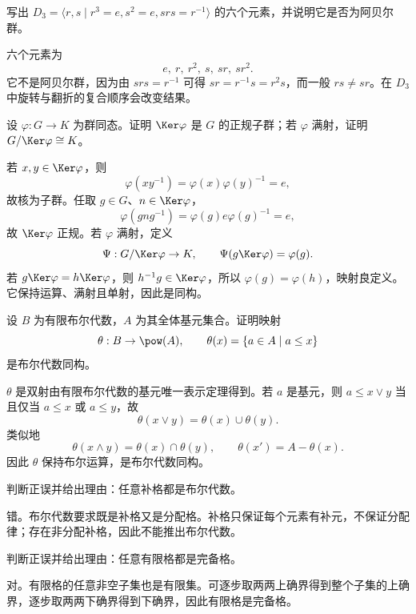 \begin{exercise}[level=advanced]
写出 $D_3=\langle r,s\mid r^3=e,s^2=e,srs=r^{-1}\rangle$ 的六个元素，并说明它是否为阿贝尔群。
\begin{solution}
六个元素为
  \[
  e,\ r,\ r^2,\ s,\ sr,\ sr^2.
  \]
  它不是阿贝尔群，因为由 $srs=r^{-1}$ 可得 $sr=r^{-1}s=r^2s$，而一般 $rs\ne sr$。在 $D_3$ 中旋转与翻折的复合顺序会改变结果。
\end{solution}
\end{exercise}

\begin{exercise}[level=advanced]
设 $\varphi:G\to K$ 为群同态。证明 $\Ker\varphi$ 是 $G$ 的正规子群；若 $\varphi$ 满射，证明 $G/\Ker\varphi\cong K$。
\begin{solution}
若 $x,y\in\Ker\varphi$，则
  \[
  \varphi(xy^{-1})=\varphi(x)\varphi(y)^{-1}=e,
  \]
  故核为子群。任取 $g\in G$、$n\in\Ker\varphi$，
  \[
  \varphi(gng^{-1})=\varphi(g)e\varphi(g)^{-1}=e,
  \]
  故 $\Ker\varphi$ 正规。若 $\varphi$ 满射，定义
  \[
  \Psi:G/\Ker\varphi\to K,\qquad \Psi(g\Ker\varphi)=\varphi(g).
  \]
  若 $g\Ker\varphi=h\Ker\varphi$，则 $h^{-1}g\in\Ker\varphi$，所以 $\varphi(g)=\varphi(h)$，映射良定义。它保持运算、满射且单射，因此是同构。
\end{solution}
\end{exercise}

\begin{exercise}[level=advanced]
设 $B$ 为有限布尔代数，$A$ 为其全体基元集合。证明映射
  \[
  \theta:B\to\pow(A),\qquad \theta(x)=\{a\in A\mid a\le x\}
  \]
  是布尔代数同构。
\begin{solution}
$\theta$ 是双射由有限布尔代数的基元唯一表示定理得到。若 $a$ 是基元，则 $a\le x\vee y$ 当且仅当 $a\le x$ 或 $a\le y$，故
  \[
  \theta(x\vee y)=\theta(x)\cup\theta(y).
  \]
  类似地
  \[
  \theta(x\wedge y)=\theta(x)\cap\theta(y),\qquad
  \theta(x')=A-\theta(x).
  \]
  因此 $\theta$ 保持布尔运算，是布尔代数同构。
\end{solution}
\end{exercise}

\begin{exercise}[level=advanced]
判断正误并给出理由：任意补格都是布尔代数。
\begin{solution}
错。布尔代数要求既是补格又是分配格。补格只保证每个元素有补元，不保证分配律；存在非分配补格，因此不能推出布尔代数。
\end{solution}
\end{exercise}

\begin{exercise}[level=advanced]
判断正误并给出理由：任意有限格都是完备格。
\begin{solution}
对。有限格的任意非空子集也是有限集。可逐步取两两上确界得到整个子集的上确界，逐步取两两下确界得到下确界，因此有限格是完备格。
\end{solution}
\end{exercise}

